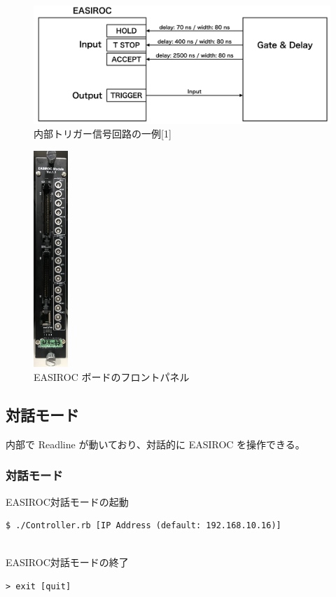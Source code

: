 \documentclass{jsarticle}
\begin{document}
\begin{figure}[H]
\begin{center}
\includegraphics[width = 13.0cm, bb= 0 0 899 358]{1.png}
\end{center}
\caption{内部トリガー信号回路の一例[1]}
\label{fig:}
\end{figure}

\begin{figure}[H]
\begin{center}
\includegraphics[width = 1.3cm, bb= 0 0 588 3683]{4.jpg}
\end{center}
\caption{EASIROC ボードのフロントパネル}
\label{fig:}
\end{figure}

\newpage
\subsection{対話モード}
内部で Readline が動いており、対話的に EASIROC を操作できる。
\subsubsection{対話モード}
EASIROC対話モードの起動
\begin{shadebox}
\begin{verbatim}
$ ./Controller.rb [IP Address (default: 192.168.10.16)]
\end{verbatim}
\end{shadebox}
　\\
EASIROC対話モードの終了
\begin{shadebox}
\begin{verbatim}
> exit [quit]
\end{verbatim}
\end{shadebox}
\end{document}

